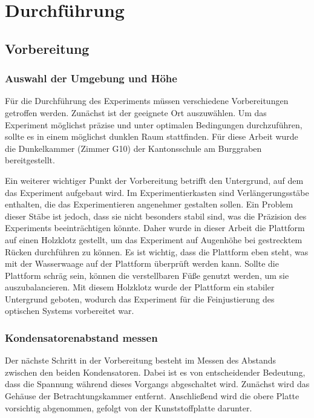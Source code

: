\chapter{Durchführung}\label{cha:durchfuehrung}
\section{Vorbereitung}\label{sec:vorbereitung}
\subsection{Auswahl der Umgebung und Höhe}\label{sub:auswahlUmgebung}
Für die Durchführung des Experiments müssen verschiedene Vorbereitungen getroffen werden. Zunächst ist der geeignete Ort auszuwählen. Um das Experiment möglichst präzise und unter optimalen Bedingungen durchzuführen, sollte es in einem möglichst dunklen Raum stattfinden. Für diese Arbeit wurde die Dunkelkammer (Zimmer G10) der Kantonsschule am Burggraben bereitgestellt.

Ein weiterer wichtiger Punkt der Vorbereitung betrifft den Untergrund, auf dem das Experiment aufgebaut wird. Im Experimentierkasten sind Verlängerungsstäbe enthalten, die das Experimentieren angenehmer gestalten sollen. Ein Problem dieser Stäbe ist jedoch, dass sie nicht besonders stabil sind, was die Präzision des Experiments beeinträchtigen könnte. Daher wurde in dieser Arbeit die Plattform auf einen Holzklotz gestellt, um das Experiment auf Augenhöhe bei gestrecktem Rücken durchführen zu können. Es ist wichtig, dass die Plattform eben steht, was mit der Wasserwaage auf der Plattform überprüft werden kann. Sollte die Plattform schräg sein, können die verstellbaren Füße genutzt werden, um sie auszubalancieren. Mit diesem Holzklotz wurde der Plattform ein stabiler Untergrund geboten, wodurch das Experiment für die Feinjustierung des optischen Systems vorbereitet war.

\subsection{Kondensatorenabstand messen}\label{sub:kondensatorenabstand}
Der nächste Schritt in der Vorbereitung besteht im Messen des Abstands zwischen den beiden Kondensatoren. Dabei ist es von entscheidender Bedeutung, dass die Spannung während dieses Vorgangs abgeschaltet wird. Zunächst wird das Gehäuse der Betrachtungskammer entfernt. Anschließend wird die obere Platte vorsichtig abgenommen, gefolgt von der Kunststoffplatte darunter.

